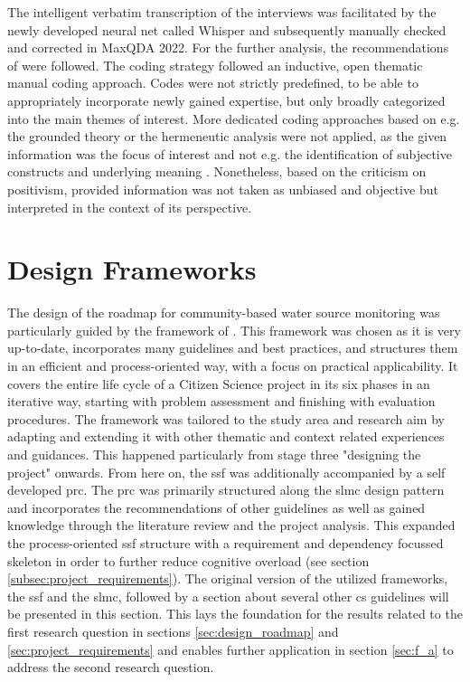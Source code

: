 The intelligent verbatim transcription of the interviews was facilitated by the newly developed neural net called Whisper \autocite{openaiIntroducingWhisper2022,openaiWhisper2023} and subsequently manually checked and corrected in MaxQDA 2022. For the further analysis, the recommendations of \autocite{radikerFocusedAnalysisQualitative2020} were followed. The coding strategy followed an inductive, open thematic manual coding approach. Codes were not strictly predefined, to be able to appropriately incorporate newly gained expertise, but only broadly categorized into the main themes of interest. More dedicated coding approaches based on e.g. the grounded theory or the hermeneutic analysis were not applied, as the given information was the focus of interest and not e.g. the identification of subjective constructs and underlying meaning \autocite{pelzResearchMethodsSocial}. Nonetheless, based on the criticism on positivism, provided information was not taken as unbiased and objective but interpreted in the context of its perspective.


\section{Design Frameworks}\label{sec:design_framework}

The design of the roadmap for community-based water source monitoring was particularly guided by the framework of \autocite{fraislCitizenScienceEnvironmental2022}. This framework was chosen as it is very up-to-date, incorporates many guidelines and best practices, and structures them in an efficient and process-oriented way, with a focus on practical applicability. It covers the entire life cycle of a Citizen Science project in its six phases in an iterative way, starting with problem assessment and finishing with evaluation procedures.\newline
The framework was tailored to the study area and research aim by adapting and extending it with other thematic and context related experiences and guidances. This happened particularly from stage three "designing the project" onwards. From here on, the \acrshort{ssf} was additionally accompanied by a self developed \acrfull{prc}. The \acrshort{prc} was primarily structured along the \acrlong{slmc} design pattern and incorporates the recommendations of other guidelines as well as gained knowledge through the literature review and the project analysis. This expanded the process-oriented \acrshort{ssf} structure with a requirement and dependency focussed skeleton in order to further reduce cognitive overload (see section \ref{subsec:project_requirements}).\newline
The original version of the utilized frameworks, the \acrshort{ssf} and the \acrshort{slmc}, followed by a section about several other \acrshort{cs} guidelines will be presented in this section. This lays the foundation for the results related to the first research question in sections \ref{sec:design_roadmap} and \ref{sec:project_requirements} and enables further application in section \ref{sec:f_a} to address the second research question.

